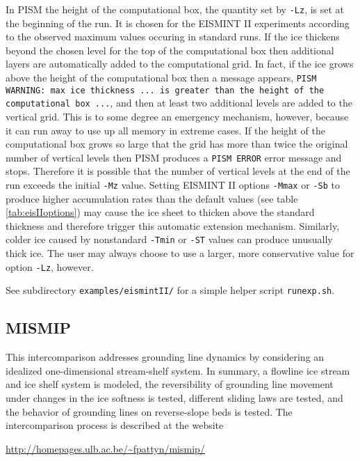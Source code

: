 In PISM the height of the computational box, the quantity set by \texttt{-Lz}, is set at the beginning of the run.  It is chosen for the EISMINT II experiments according to the observed maximum values occuring in standard runs.  If the ice thickens beyond the chosen level for the top of the computational box then additional layers are automatically added to the computational grid.  In fact, if the ice grows above the height of the computational box then a message appears, \texttt{PISM WARNING: max ice thickness ... is greater than the height of the computational box ...}, and then at least two additional levels are added to the vertical grid.  This is to some degree an emergency mechanism, however, because it can run away to use up all memory in extreme cases.  If the height of the computational box grows so large that the grid has more than twice the original number of vertical levels then PISM produces a \texttt{PISM ERROR} error message and stops.   Therefore it is possible that the number of vertical levels at the end of the run exceeds the initial \texttt{-Mz} value.  Setting EISMINT II options \texttt{-Mmax} or \texttt{-Sb} to produce higher accumulation rates than the default values (see table \ref{tab:eisIIoptions}) may cause the ice sheet to thicken above the standard thickness and therefore trigger this automatic extension mechanism.  Similarly, colder ice caused by nonstandard \texttt{-Tmin} or \texttt{-ST} values can produce unusually thick ice.  The user may always choose to use a larger, more conservative value for option \texttt{-Lz}, however.

See subdirectory \verb|examples/eismintII/| for a simple helper script \verb|runexp.sh|.


\subsection{MISMIP}\label{subsect:MISMIP}

This intercomparison addresses grounding line dynamics by considering an idealized one-dimensional stream-shelf system.  In summary, a flowline ice stream and ice shelf system is modeled, the reversibility of grounding line movement under changes in the ice softness is tested, different sliding laws are tested, and the behavior of grounding lines on reverse-slope beds is tested.  The intercomparison process is described at the website

\centerline{\url{http://homepages.ulb.ac.be/~fpattyn/mismip/}}

